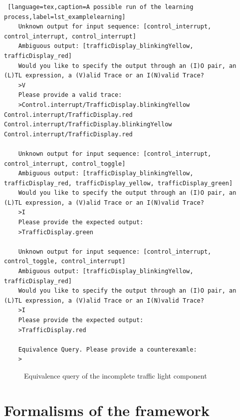 \begin{lstlisting} [language=tex,caption=A possible run of the learning process,label=lst_examplelearning]
	Unknown output for input sequence: [control_interrupt, control_interrupt, control_interrupt]
	Ambiguous output: [trafficDisplay_blinkingYellow, trafficDisplay_red]
	Would you like to specify the output through an (I)O pair, an (L)TL expression, a (V)alid Trace or an I(N)valid Trace?
	>V
	Please provide a valid trace:
	>Control.interrupt/TrafficDisplay.blinkingYellow Control.interrupt/TrafficDisplay.red Control.interrupt/TrafficDisplay.blinkingYellow Control.interrupt/TrafficDisplay.red
	
	Unknown output for input sequence: [control_interrupt, control_interrupt, control_toggle]
	Ambiguous output: [trafficDisplay_blinkingYellow, trafficDisplay_red, trafficDisplay_yellow, trafficDisplay_green]
	Would you like to specify the output through an (I)O pair, an (L)TL expression, a (V)alid Trace or an I(N)valid Trace?
	>I
	Please provide the expected output:
	>TrafficDisplay.green
	
	Unknown output for input sequence: [control_interrupt, control_toggle, control_interrupt]
	Ambiguous output: [trafficDisplay_blinkingYellow, trafficDisplay_red] 
	Would you like to specify the output through an (I)O pair, an (L)TL expression, a (V)alid Trace or an I(N)valid Trace?
	>I
	Please provide the expected output:
	>TrafficDisplay.red
	
	Equivalence Query. Please provide a counterexamle:
	>
\end{lstlisting}

\bigskip
\begin{figure}[!ht] 
	\centering
	\caption{Equivalence query of the incomplete traffic light component} 
	\label{fig_trafficlightincomplete}
\end{figure}
\clearpage
\chapter{Formalisms of the framework}

